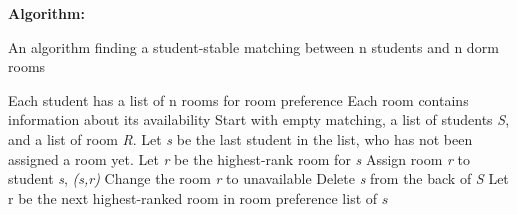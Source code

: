 \documentclass{article}
\begin{document}
    \textbf{Algorithm: }
    \begin{algorithm}
    \caption{An algorithm finding a student-stable matching between n students and n dorm rooms}\label{alg:cap}
    \begin{algorithmic}
    \Require Each student has a list of n rooms for room preference
    \Ensure Each room contains information about its availability
    \State Start with empty matching, a list of students \textit{S}, and a list of room \textit{R}.
        \State Let \textit{s} be the last student in the list, who has not been assigned a room yet.
        \State Let \textit{r} be the highest-rank room for \textit{s}
                    \State Assign room \textit{r} to student \textit{s}, \textit{(s,r)}
                    \State Change the room \textit{r} to unavailable
                    \State Delete \textit{s} from the back of \textit{S}
                \Else
                    \State Let r be the next highest-ranked room in room preference list of $s$
                \EndIf
        \EndWhile
    \EndWhile
    \end{algorithmic}
    \end{algorithm}
\end{document}
